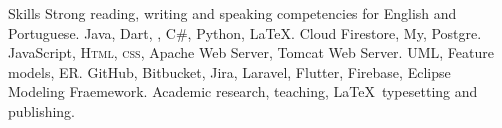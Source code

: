 
\begin{rubric}{Skills}
\entry*[Languages]
	Strong reading, writing and speaking competencies for English and Portuguese.
	Java, Dart, , C\#, Python, \LaTeX.
\entry*[Databases]
	Cloud Firestore, My, Postgre.
	JavaScript, \textsc{Html, css}, Apache Web Server, Tomcat Web Server.
 \entry*[Modeling.]
	UML, Feature models, ER. 
\entry*[Technologies]
	GitHub, Bitbucket, Jira, Laravel, Flutter, Firebase, Eclipse Modeling Fraemework.
\entry*[Misc.]
	Academic research, teaching, \LaTeX\ typesetting and publishing.
\end{rubric}
